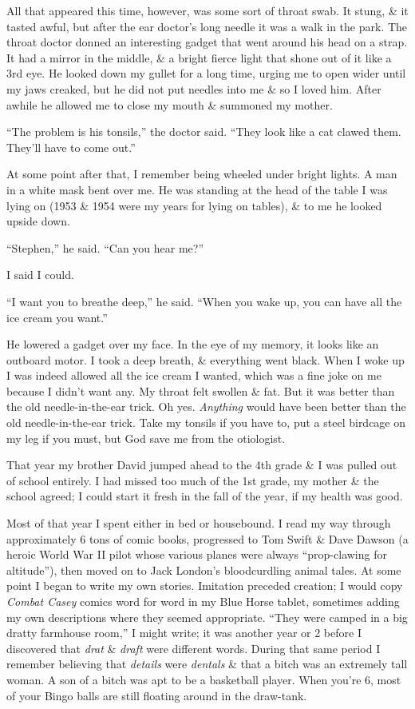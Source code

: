\documentclass{article}
\numberwithin{equation}{section}
\begin{document}
All that appeared this time, however, was some sort of throat swab. It stung, \& it tasted awful, but after the ear doctor's long needle it was a walk in the park. The throat doctor donned an interesting gadget that went around his head on a strap. It had a mirror in the middle, \& a bright fierce light that shone out of it like a 3rd eye. He looked down my gullet for a long time, urging me to open wider until my jaws creaked, but he did not put needles into me \& so I loved him. After awhile he allowed me to close my mouth \& summoned my mother.

``The problem is his tonsils,'' the doctor said. ``They look like a cat clawed them. They'll have to come out.''

At some point after that, I remember being wheeled under bright lights. A man in a white mask bent over me. He was standing at the head of the table I was lying on (1953 \& 1954 were my years for lying on tables), \& to me he looked upside down.

``Stephen,'' he said. ``Can you hear me?''

I said I could.

``I want you to breathe deep,'' he said. ``When you wake up, you can have all the ice cream you want.''

He lowered a gadget over my face. In the eye of my memory, it looks like an outboard motor. I took a deep breath, \& everything went black. When I woke up I was indeed allowed all the ice cream I wanted, which was a fine joke on me because I didn't want any. My throat felt swollen \& fat. But it was better than the old needle-in-the-ear trick. Oh yes. \textit{Anything} would have been better than the old needle-in-the-ear trick. Take my tonsils if you have to, put a steel birdcage on my leg if you must, but God save me from the otiologist.

 That year my brother David jumped ahead to the 4th grade \& I was pulled out of school entirely. I had missed too much of the 1st grade, my mother \& the school agreed; I could start it fresh in the fall of the year, if my health was good.

Most of that year I spent either in bed or housebound. I read my way through approximately 6 tons of comic books, progressed to Tom Swift \& Dave Dawson (a heroic World War II pilot whose various planes were always ``prop-clawing for altitude''), then moved on to Jack London's bloodcurdling animal tales. At some point I began to write my own stories. Imitation preceded creation; I would copy \textit{Combat Casey} comics word for word in my Blue Horse tablet, sometimes adding my own descriptions where they seemed appropriate. ``They were camped in a big dratty farmhouse room,'' I might write; it was another year or 2 before I discovered that \textit{drat} \& \textit{draft} were different words. During that same period I remember believing that \textit{details} were \textit{dentals} \& that a bitch was an extremely tall woman. A son of a bitch was apt to be a basketball player. When you're 6, most of your Bingo balls are still floating around in the draw-tank.
\end{document}
